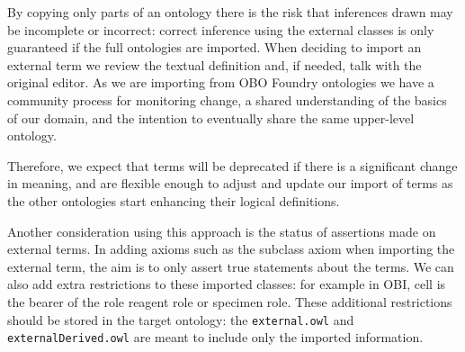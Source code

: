 \documentclass[a4paper,10pt,twocolumn]{article}
\newcommand{\protege}{Prot\'{e}g\'{e}}
\begin{document}
By copying only parts of an ontology there is the risk that inferences drawn may be incomplete or incorrect: correct inference using the external classes is only guaranteed if the full ontologies are imported.
When deciding to import an external term we review the textual definition and, if needed, talk with the original editor.
As we are importing from OBO Foundry ontologies we have a community process for monitoring change, a shared understanding of the basics of our domain, and the intention to eventually share the same upper-level ontology. 

Therefore, we expect that terms will be deprecated if there is a significant change in meaning, and are flexible enough to adjust and update our import of terms as the other ontologies start enhancing their logical definitions.


Another consideration using this approach is the status of assertions made on external terms.
In adding axioms such as the subclass axiom when importing the external term, the aim is to only assert true statements about the terms.
We can also add extra restrictions to these imported classes: for example in OBI, cell is the bearer of the role reagent role or specimen role. 
These additional restrictions should be stored in the target ontology: the \texttt{external.owl} and \texttt{externalDerived.owl} are meant to include only the imported information.
\end{document}
